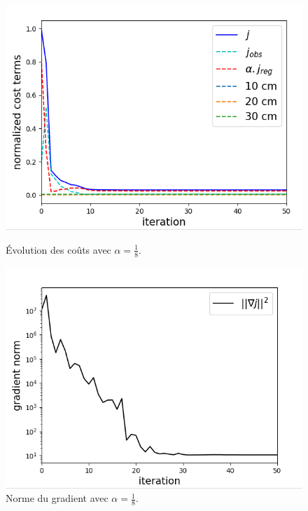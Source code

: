 \documentclass{article}
\begin{document}
\begin{figure}[H]
    \centering
    \begin{minipage}[b]{0.45\linewidth}
        \centering
        \includegraphics[width=\linewidth]{Images_Ayoub/With_Regularisation/Alpha_Const/Graphs/Costs.png}
        \caption{Évolution des coûts avec \(\alpha=\tfrac18\).}
        \label{fig:wr-costs}
    \end{minipage}
    \hfill
    \begin{minipage}[b]{0.45\linewidth}
        \centering
        \includegraphics[width=\linewidth]{Images_Ayoub/With_Regularisation/Alpha_Const/Graphs/Gradient.png}
        \caption{Norme du gradient avec \(\alpha=\tfrac18\).}
        \label{fig:wr-gradient}
    \end{minipage}


\end{figure}
\end{document}
